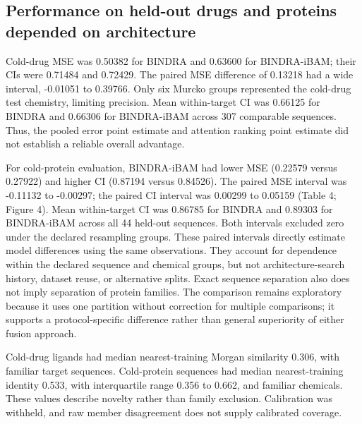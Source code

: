 \documentclass[12pt,a4paper]{article}
\begin{document}
\subsection*{Performance on held-out drugs and proteins depended on architecture}
Cold-drug MSE was 0.50382 for BINDRA and 0.63600 for BINDRA-iBAM; their CIs were 0.71484 and 0.72429. The paired MSE difference of 0.13218 had a wide interval, -0.01051 to 0.39766. Only six Murcko groups represented the cold-drug test chemistry, limiting precision. Mean within-target CI was 0.66125 for BINDRA and 0.66306 for BINDRA-iBAM across 307 comparable sequences. Thus, the pooled error point estimate and attention ranking point estimate did not establish a reliable overall advantage.

For cold-protein evaluation, BINDRA-iBAM had lower MSE (0.22579 versus 0.27922) and higher CI (0.87194 versus 0.84526). The paired MSE interval was -0.11132 to -0.00297; the paired CI interval was 0.00299 to 0.05159 (Table 4; Figure 4). Mean within-target CI was 0.86785 for BINDRA and 0.89303 for BINDRA-iBAM across all 44 held-out sequences. Both intervals excluded zero under the declared resampling groups. These paired intervals directly estimate model differences using the same observations. They account for dependence within the declared sequence and chemical groups, but not architecture-search history, dataset reuse, or alternative splits. Exact sequence separation also does not imply separation of protein families. The comparison remains exploratory because it uses one partition without correction for multiple comparisons; it supports a protocol-specific difference rather than general superiority of either fusion approach.

\nolinenumbers\linenumbers
Cold-drug ligands had median nearest-training Morgan similarity 0.306, with familiar target sequences. Cold-protein sequences had median nearest-training identity 0.533, with interquartile range 0.356 to 0.662, and familiar chemicals. These values describe novelty rather than family exclusion. Calibration was withheld, and raw member disagreement does not supply calibrated coverage.
\end{document}
